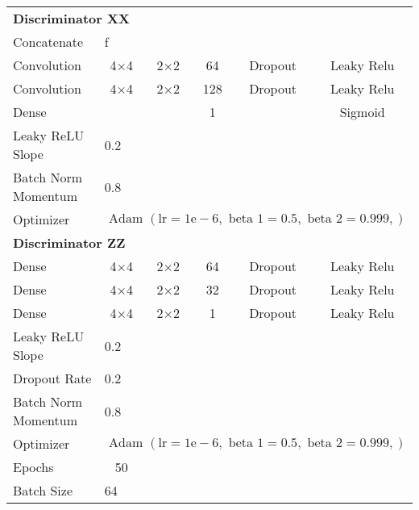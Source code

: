 \begin{longtable}[c]{@{}lccccc@{}}
	\multicolumn{6}{l}{\textbf{Discriminator XX}} \\
	Concatenate &\multicolumn{5}{l}{f} \\
	Convolution & \multicolumn{1}{c}{4$\times$4} & 2$\times$2 & 64 & Dropout & Leaky Relu \\
	Convolution & \multicolumn{1}{c}{4$\times$4} & 2$\times$2 & 128 & Dropout & Leaky Relu \\
	Dense & \multicolumn{1}{c}{} &  & 1 &  & Sigmoid \\ \hline
	Leaky ReLU Slope & \multicolumn{5}{l}{0.2} \\
	Batch Norm Momentum & \multicolumn{5}{l}{0.8} \\
	Optimizer & \multicolumn{5}{l}{$\text { Adam }(\mathrm{lr}=1 \mathrm{e}-6, \text { beta } 1=0.5, \text { beta } 2=0.999,)$} \\ \hline
	\multicolumn{6}{l}{\textbf{Discriminator ZZ}} \\
	Dense & \multicolumn{1}{c}{4$\times$4} & 2$\times$2 & 64 & Dropout & Leaky Relu \\
	Dense & \multicolumn{1}{c}{4$\times$4} & 2$\times$2 & 32 & Dropout & Leaky Relu \\
	Dense & \multicolumn{1}{c}{4$\times$4} & 2$\times$2 & 1 & Dropout & Leaky Relu \\ \hline
	Leaky ReLU Slope & \multicolumn{5}{l}{0.2} \\
	Dropout Rate & \multicolumn{5}{l}{0.2} \\
	Batch Norm Momentum & \multicolumn{5}{l}{0.8} \\
	Optimizer & \multicolumn{5}{l}{$\text { Adam }(\mathrm{lr}=1 \mathrm{e}-6, \text { beta } 1=0.5, \text { beta } 2=0.999,)$} \\ \hline
	Epochs & 50 & \multicolumn{1}{l}{} & \multicolumn{1}{l}{} & \multicolumn{1}{l}{} & \multicolumn{1}{l}{} \\
	Batch Size & \multicolumn{5}{l}{64}
\end{longtable}

\endgroup